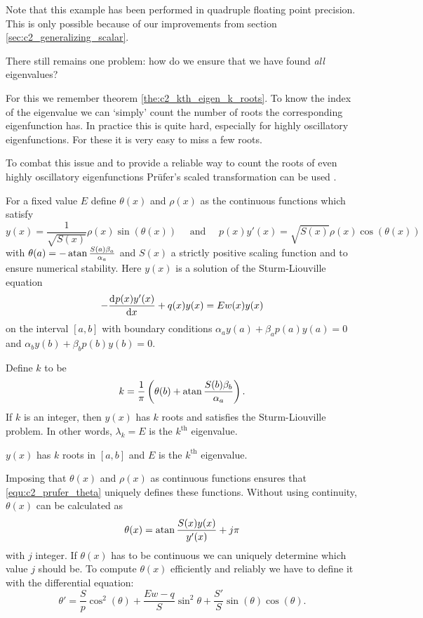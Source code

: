 Note that this example has been performed in quadruple floating point precision. This is only possible because of our improvements from section \ref{sec:c2_generalizing_scalar}.


There still remains one problem: how do we ensure that we have found \emph{all} eigenvalues?

For this we remember theorem \ref{the:c2_kth_eigen_k_roots}. To know the index of the eigenvalue we can `simply' count the number of roots the corresponding eigenfunction has. In practice this is quite hard, especially for highly oscillatory eigenfunctions. For these it is very easy to miss a few roots.

To combat this issue and to provide a reliable way to count the roots of even highly oscillatory eigenfunctions Prüfer's scaled transformation can be used \cite{pruefer_neue_1926}.

\begin{theorem}[Prüfer 1926]\label{the:c2_prufer_transformation}
    For a fixed value $E$ define $\theta(x)$ and $\rho(x)$ as the continuous functions which satisfy
    \begin{equation}\label{equ:c2_prufer_theta}
        y(x) = \frac{1}{\sqrt{S(x)}} \rho(x) \sin(\theta(x)) \quad\text{ and }\quad p(x)y'(x) = \sqrt{S(x)} \rho(x) \cos(\theta(x))
    \end{equation}
    with $\theta(a) = -\atan\frac{S(a)\beta_a}{\alpha_a}$ and $S(x)$ a strictly positive scaling function and to ensure numerical stability.
    Here $y(x)$ is a solution of the Sturm-Liouville equation
    $$
        -\dv[]{p(x)y'(x)}{x} + q(x) y(x) = E w(x) y(x)
    $$
    on the interval $[a, b]$ with boundary conditions $\alpha_a y(a) + \beta_a p(a) y(a) = 0$ and $\alpha_b y(b) + \beta_b p(b) y(b) = 0$.

    Define $k$ to be
    $$
        k = \frac{1}{\pi}\left(\theta(b) + \atan\frac{S(b)\beta_b}{\alpha_a}\right) \text{.}
    $$
    If $k$ is an integer, then $y(x)$ has $k$ roots and satisfies the Sturm-Liouville problem. In other words, $\lambda_k = E$ is the $k^\text{th}$ eigenvalue.

    $y(x)$ has $k$ roots in $[a, b]$ and $E$ is the $k^\text{th}$ eigenvalue.
\end{theorem}

Imposing that $\theta(x)$ and $\rho(x)$ as continuous functions ensures that \eqref{equ:c2_prufer_theta} uniquely defines these functions. Without using continuity, $\theta(x)$ can be calculated as
\begin{equation}\label{equ:c2_prufer_theta_up_to_pi}
    \theta(x) = \atan\frac{S(x)y(x)}{y'(x)} + j\pi
\end{equation}
with $j$ integer. If $\theta(x)$ has to be continuous we can uniquely determine which value $j$ should be. To compute $\theta(x)$ efficiently and reliably we have to define it with the differential equation:
\begin{equation}\label{equ:c2_prufer_theta_ode}
    \theta' = \frac{S}{p} \cos^2(\theta) + \frac{Ew - q}{S}\sin^2\theta + \frac{S'}{S}\sin(\theta)\cos(\theta)\text{.}
\end{equation}

